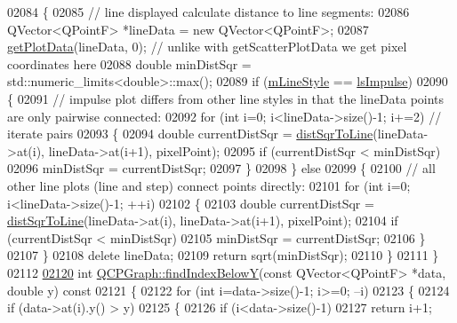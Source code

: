 \begin{DoxyCode}
02084   \{
02085     \textcolor{comment}{// line displayed calculate distance to line segments:}
02086     QVector<QPointF> *lineData = \textcolor{keyword}{new} QVector<QPointF>;
02087     \hyperlink{a00031_af66183533a29520be3e74489ad1449cc}{getPlotData}(lineData, 0); \textcolor{comment}{// unlike with getScatterPlotData we get pixel coordinates here}
02088     \textcolor{keywordtype}{double} minDistSqr = std::numeric\_limits<double>::max();
02089     \textcolor{keywordflow}{if} (\hyperlink{a00031_a8604fd98402035a63375849f7341ee25}{mLineStyle} == \hyperlink{a00031_ad60175cd9b5cac937c5ee685c32c0859aa3b358b4ae7cca94aceeb8e529c12ebb}{lsImpulse})
02090     \{
02091       \textcolor{comment}{// impulse plot differs from other line styles in that the lineData points are only pairwise
       connected:}
02092       \textcolor{keywordflow}{for} (\textcolor{keywordtype}{int} i=0; i<lineData->size()-1; i+=2) \textcolor{comment}{// iterate pairs}
02093       \{
02094         \textcolor{keywordtype}{double} currentDistSqr = \hyperlink{a00024_a5ea1cab44ca912dcdc96ed81ec5bed5d}{distSqrToLine}(lineData->at(i), lineData->at(i+1), pixelPoint);
02095         \textcolor{keywordflow}{if} (currentDistSqr < minDistSqr)
02096           minDistSqr = currentDistSqr;
02097       \}
02098     \} \textcolor{keywordflow}{else} 
02099     \{
02100       \textcolor{comment}{// all other line plots (line and step) connect points directly:}
02101       \textcolor{keywordflow}{for} (\textcolor{keywordtype}{int} i=0; i<lineData->size()-1; ++i)
02102       \{
02103         \textcolor{keywordtype}{double} currentDistSqr = \hyperlink{a00024_a5ea1cab44ca912dcdc96ed81ec5bed5d}{distSqrToLine}(lineData->at(i), lineData->at(i+1), pixelPoint);
02104         \textcolor{keywordflow}{if} (currentDistSqr < minDistSqr)
02105           minDistSqr = currentDistSqr;
02106       \}
02107     \}
02108     \textcolor{keyword}{delete} lineData;
02109     \textcolor{keywordflow}{return} sqrt(minDistSqr);
02110   \}
02111 \}
02112 
\hypertarget{a00115_source_l02120}{}\hyperlink{a00031_a6c4d556de3d1e02f548401001f72c6ff}{02120} \textcolor{keywordtype}{int} \hyperlink{a00031_a6c4d556de3d1e02f548401001f72c6ff}{QCPGraph::findIndexBelowY}(\textcolor{keyword}{const} QVector<QPointF> *data, \textcolor{keywordtype}{double} y)\textcolor{keyword}{ const}
02121 \textcolor{keyword}{}\{
02122   \textcolor{keywordflow}{for} (\textcolor{keywordtype}{int} i=data->size()-1; i>=0; --i)
02123   \{
02124     \textcolor{keywordflow}{if} (data->at(i).y() > y)
02125     \{
02126       \textcolor{keywordflow}{if} (i<data->size()-1)
02127         \textcolor{keywordflow}{return} i+1;

\end{DoxyCode}
